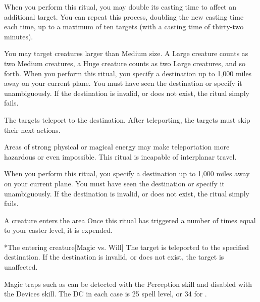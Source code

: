\spellspecial When you perform this ritual, you may double its casting time to affect an additional target. You can repeat this process, doubling the new casting time each time, up to a maximum of ten targets (with a casting time of thirty-two minutes).

You may target creatures larger than Medium size. A Large creature counts as two Medium creatures, a Huge creature counts as two Large creatures, and so forth.
\spelleffect When you perform this ritual, you specify a destination up to 1,000 miles away on your current plane. You must have seen the destination or specify it unambiguously. If the destination is invalid, or does not exist, the ritual simply fails.

The targets teleport to the destination. After teleporting, the targets must skip their next actions.

\spellnotes Areas of strong physical or magical energy may make teleportation more hazardous or even impossible. This ritual is incapable of interplanar travel.

\spellspecial When you perform this ritual, you specify a destination up to 1,000 miles away on your current plane. You must have seen the destination or specify it unambiguously. If the destination is invalid, or does not exist, the ritual simply fails.
\begin{spelltrigger}{A creature enters the area}
    \spellspecial Once this ritual has triggered a number of times equal to your caster level, it is expended.
    \begin{spelltarget}*{The entering creature}[Magic vs. Will]
        \spelleffect The target is teleported to the specified destination. If the destination is invalid, or does not exist, the target is unaffected.
    \end{spelltarget}
\end{spelltrigger}

\spellnotes Magic traps such as  can be detected with the Perception skill and disabled with the Devices skill. The DC in each case is 25 \add spell level, or 34 for .

